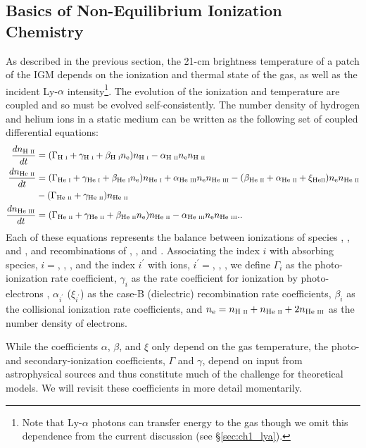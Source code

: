 \subsection{Basics of Non-Equilibrium Ionization Chemistry} \label{sec:ioniz_heating}
As described in the previous section, the 21-cm brightness temperature of a patch of the IGM depends on the ionization and thermal state of the gas, as well as the incident Ly-$\alpha$ intensity\footnote{Note that Ly-$\alpha$ photons can transfer energy to the gas though we omit this dependence from the current discussion (see \S\ref{sec:ch1_lya}).}. The evolution of the ionization and temperature are coupled and so must be evolved self-consistently. The number density of hydrogen and helium ions in a static medium can be written as the following set of coupled differential equations:
\begin{align}
    \frac{d n_{\text{H } \textsc{ii}}}{dt} & = (\Gamma_{\text{H } \textsc{i}} + \gamma_{\text{H } \textsc{i}} + \beta_{\text{H } \textsc{i}} n_{\text{e}}) n_{\text{H } \textsc{i}} - \alpha_{\text{H } \textsc{ii}} n_{\text{e}} n_{\text{H } \textsc{ii}}   \label{eq:HIIRateEquation} \\
    \frac{d n_{\text{He } \textsc{ii}}}{dt} & = (\Gamma_{\text{He } \textsc{i}} + \gamma_{\text{He } \textsc{i}} + \beta_{\text{He } \textsc{i}} n_{\text{e}}) n_{\text{He } \textsc{i}} \nonumber + \alpha_{\text{He } \textsc{iii}} n_{\text{e}} n_{\text{He } \textsc{iii}}  - (\beta_{\text{He } \textsc{ii}} + \alpha_{\text{He } \textsc{ii}} + \xi_{\text{He} \textsc{ii}}) n_{\text{e}} n_{\text{He } \textsc{ii}} \\ & - (\Gamma_{\text{He } \textsc{ii}} + \gamma_{\text{He } \textsc{ii}}) n_{\text{He } \textsc{ii}} \label{eq:HeIIRateEquation} \\ 
    \frac{d n_{\text{He } \textsc{iii}}}{dt} & = (\Gamma_{\text{He } \textsc{ii}} + \gamma_{\text{He } \textsc{ii}} + \beta_{\text{He } \textsc{ii}} n_{\text{e}}) n_{\text{He } \textsc{ii}}  - \alpha_{\text{He } \textsc{iii}} n_{\text{e}} n_{\text{He } \textsc{iii}} . \label{eq:HeIIIRateEquation} .
\end{align}
Each of these equations represents the balance between ionizations of species
\HI, \HeI, and \HeII, and recombinations of \HII, \HeII, and
\HeIII. Associating the index $i$ with absorbing species, $i = $\HI, \HeI,
\HeII, and the index $i^{\prime}$ with ions, $i^{\prime} = $\HII, \HeII,
\HeIII, we define $\Gamma_i$ as the photo-ionization rate coefficient,
$\gamma_i$ as the rate coefficient for ionization by photo-electrons \cite[and \S\ref{sec:ch1_xrb}]{Shull1985,Furlanetto2010}, $\alpha_{i^{\prime}}$
($\xi_{i^{\prime}}$) as the case-B (dielectric) recombination rate
coefficients, $\beta_i$ as the collisional ionization rate coefficients, and
$n_{\text{e}} = n_{\text{H } \textsc{ii}} + n_{\text{He } \textsc{ii}} + 2n_{\text{He } \textsc{iii}}$ as the number density of electrons.

While the coefficients $\alpha$, $\beta$, and $\xi$ only depend on the gas temperature, the photo- and secondary-ionization coefficients, $\Gamma$ and $\gamma$, depend on input from astrophysical sources and thus constitute much of the challenge for theoretical models. We will revisit these coefficients in more detail momentarily.


